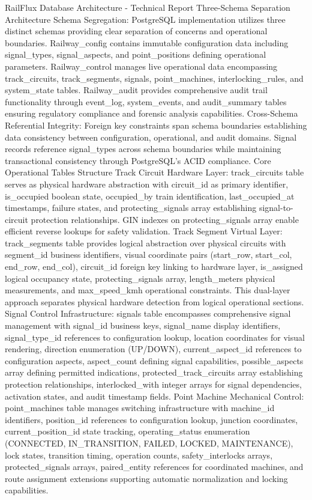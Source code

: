 RailFlux Database Architecture - Technical Report
Three-Schema Separation Architecture
Schema Segregation: PostgreSQL implementation utilizes three distinct schemas providing clear separation of concerns and operational boundaries. Railway_config contains immutable configuration data including signal_types, signal_aspects, and point_positions defining operational parameters. Railway_control manages live operational data encompassing track_circuits, track_segments, signals, point_machines, interlocking_rules, and system_state tables. Railway_audit provides comprehensive audit trail functionality through event_log, system_events, and audit_summary tables ensuring regulatory compliance and forensic analysis capabilities.
Cross-Schema Referential Integrity: Foreign key constraints span schema boundaries establishing data consistency between configuration, operational, and audit domains. Signal records reference signal_types across schema boundaries while maintaining transactional consistency through PostgreSQL's ACID compliance.
Core Operational Tables Structure
Track Circuit Hardware Layer: track_circuits table serves as physical hardware abstraction with circuit_id as primary identifier, is_occupied boolean state, occupied_by train identification, last_occupied_at timestamps, failure states, and protecting_signals array establishing signal-to-circuit protection relationships. GIN indexes on protecting_signals array enable efficient reverse lookups for safety validation.
Track Segment Virtual Layer: track_segments table provides logical abstraction over physical circuits with segment_id business identifiers, visual coordinate pairs (start_row, start_col, end_row, end_col), circuit_id foreign key linking to hardware layer, is_assigned logical occupancy state, protecting_signals array, length_meters physical measurements, and max_speed_kmh operational constraints. This dual-layer approach separates physical hardware detection from logical operational sections.
Signal Control Infrastructure: signals table encompasses comprehensive signal management with signal_id business keys, signal_name display identifiers, signal_type_id references to configuration lookup, location coordinates for visual rendering, direction enumeration (UP/DOWN), current_aspect_id references to configuration aspects, aspect_count defining signal capabilities, possible_aspects array defining permitted indications, protected_track_circuits array establishing protection relationships, interlocked_with integer arrays for signal dependencies, activation states, and audit timestamp fields.
Point Machine Mechanical Control: point_machines table manages switching infrastructure with machine_id identifiers, position_id references to configuration lookup, junction coordinates, current_position_id state tracking, operating_status enumeration (CONNECTED, IN_TRANSITION, FAILED, LOCKED, MAINTENANCE), lock states, transition timing, operation counts, safety_interlocks arrays, protected_signals arrays, paired_entity references for coordinated machines, and route assignment extensions supporting automatic normalization and locking capabilities.
